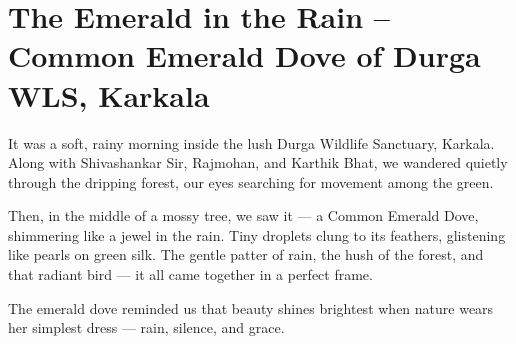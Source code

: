 \documentclass[12pt]{article}
\begin{document}
\newpage

\section*{The Emerald in the Rain – Common Emerald Dove of Durga WLS, Karkala}
\label{bird:9}
\vspace{0.5em}
\noindent
\begin{minipage}[t][11.5cm][c]{12.0cm}\centering {}\end{minipage}\hspace{0.8cm}\begin{minipage}[t][11.5cm][t]{11.5cm}\justifying \noindent It was a soft, rainy morning inside the lush Durga Wildlife Sanctuary, Karkala. Along with Shivashankar Sir, Rajmohan, and Karthik Bhat, we wandered quietly through the dripping forest, our eyes searching for movement among the green.

Then, in the middle of a mossy tree, we saw it — a Common Emerald Dove, shimmering like a jewel in the rain. Tiny droplets clung to its feathers, glistening like pearls on green silk. The gentle patter of rain, the hush of the forest, and that radiant bird — it all came together in a perfect frame.\end{minipage}
\newpage
\vspace*{0.3cm}
\noindent The emerald dove reminded us that beauty shines brightest when nature wears her simplest dress — rain, silence, and grace.

\newpage
\end{document}
